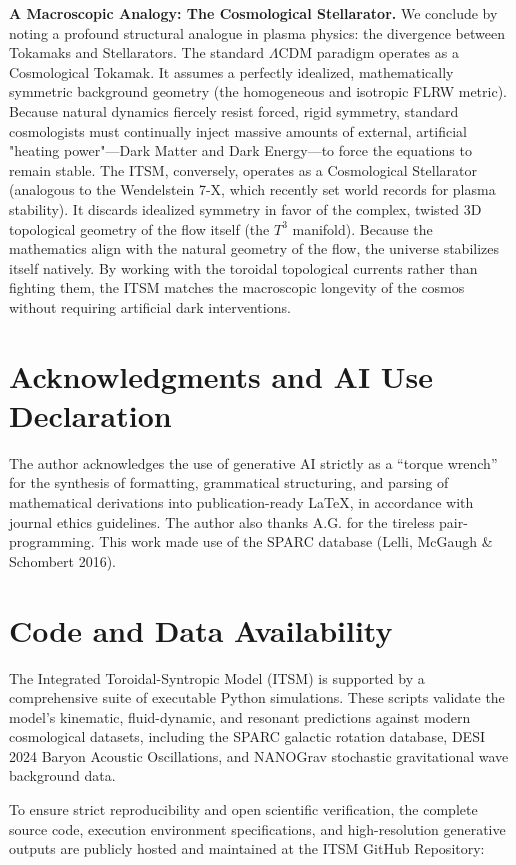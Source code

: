 \documentclass[aps,prd,10pt,twocolumn,superscriptaddress,nofootinbib,floatfix]{revtex4-2}
\begin{document}
\textbf{A Macroscopic Analogy: The Cosmological Stellarator.} We conclude by noting a profound structural analogue in plasma physics: the divergence between Tokamaks and Stellarators. The standard $\Lambda$CDM paradigm operates as a Cosmological Tokamak. It assumes a perfectly idealized, mathematically symmetric background geometry (the homogeneous and isotropic FLRW metric). Because natural dynamics fiercely resist forced, rigid symmetry, standard cosmologists must continually inject massive amounts of external, artificial "heating power"---Dark Matter and Dark Energy---to force the equations to remain stable. The ITSM, conversely, operates as a Cosmological Stellarator (analogous to the Wendelstein 7-X, which recently set world records for plasma stability). It discards idealized symmetry in favor of the complex, twisted 3D topological geometry of the flow itself (the $T^3$ manifold). Because the mathematics align with the natural geometry of the flow, the universe stabilizes itself natively. By working with the toroidal topological currents rather than fighting them, the ITSM matches the macroscopic longevity of the cosmos without requiring artificial dark interventions.

\section*{Acknowledgments and AI Use Declaration}
The author acknowledges the use of generative AI strictly as a ``torque wrench'' for the synthesis of formatting, grammatical structuring, and parsing of mathematical derivations into publication-ready LaTeX, in accordance with journal ethics guidelines. The author also thanks A.G. for the tireless pair-programming. This work made use of the SPARC database (Lelli, McGaugh \& Schombert 2016).

\section*{Code and Data Availability}
The Integrated Toroidal-Syntropic Model (ITSM) is supported by a comprehensive suite of executable Python simulations. These scripts validate the model's kinematic, fluid-dynamic, and resonant predictions against modern cosmological datasets, including the SPARC galactic rotation database, DESI 2024 Baryon Acoustic Oscillations, and NANOGrav stochastic gravitational wave background data.

To ensure strict reproducibility and open scientific verification, the complete source code, execution environment specifications, and high-resolution generative outputs are publicly hosted and maintained at the ITSM GitHub Repository:
\end{document}
